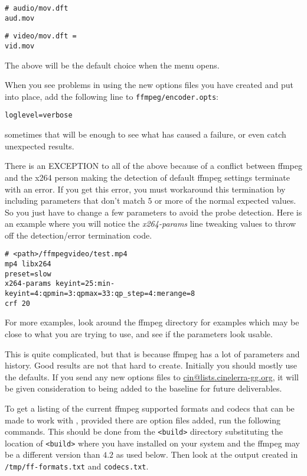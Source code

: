 \begin{lstlisting}[style=sh]
# audio/mov.dft
aud.mov
\end{lstlisting}

\begin{lstlisting}[style=sh]
# video/mov.dft =
vid.mov
\end{lstlisting}

The above will be the default choice when the menu opens.  

When you see problems in using the new options files you have created and put into place, add the following line to \texttt{ffmpeg/encoder.opts}:

\begin{lstlisting}[style=sh]
loglevel=verbose
\end{lstlisting}

sometimes that will be enough to see what has caused a failure, or even catch unexpected results.

There is an \textsc{EXCEPTION} to all of the above because of a conflict between ffmpeg and the x264 person making the detection of default ffmpeg settings terminate with an error.  If you get this error, you must workaround this termination by including parameters that don't match $5$ or more of the normal expected values.  So you just have to change a few parameters to avoid the probe detection.  Here is an example where you will notice the \textit{x264-params} line tweaking values to throw off the detection/error termination code.

\begin{lstlisting}[style=sh]
# <path>/ffmpegvideo/test.mp4
mp4 libx264
preset=slow
x264-params keyint=25:min-keyint=4:qpmin=3:qpmax=33:qp_step=4:merange=8
crf 20
\end{lstlisting}

For more examples, look around the ffmpeg directory for examples which may be close to what you are trying to use, and see if the parameters look usable. 

This is quite complicated, but that is because ffmpeg has a lot of parameters and history.  Good results are not that hard to create.  Initially you should mostly use the defaults.  
If you send any new options files to \href{mailto:cin@lists.cinelerra-gg.org}{cin@lists.cinelerra-gg.org}, it will be given consideration to being added to the baseline for future deliverables.

To get a listing of the current ffmpeg supported formats and codecs that can be made to work with \CGG{}, provided there are option files added, run the following commands.  This should be done from the \texttt{<build>} directory substituting the location of \texttt{<build>} where you have installed \CGG{} on your system and the ffmpeg may be a different version than $4.2$ as used below.  Then look at the output created in \texttt{/tmp/ff-formats.txt} and \texttt{codecs.txt}.

